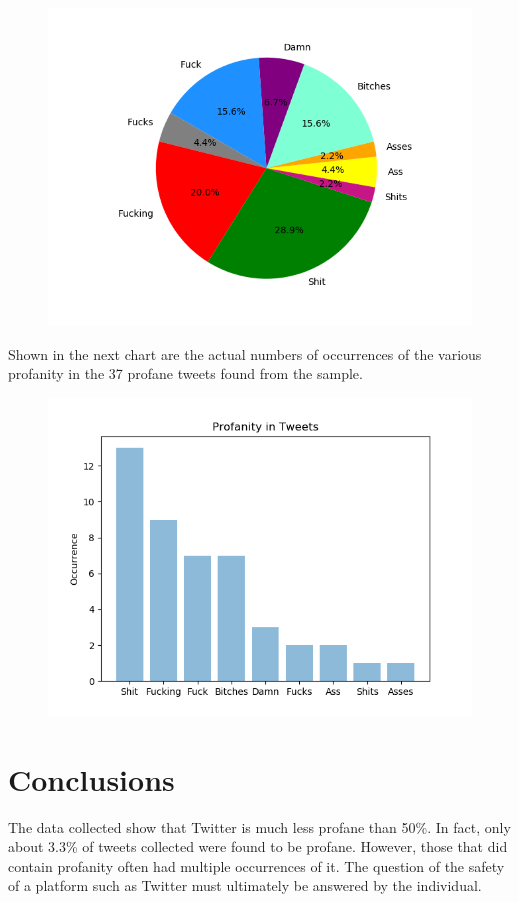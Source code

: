 \documentclass{article}
\begin{document}
\begin{figure}[h]
	\includegraphics[scale=1]{Figure_1}
\end{figure}

Shown in the next chart are the actual numbers of occurrences of the various profanity in the 37 profane tweets found from the sample.

\begin{figure}[h]
	\includegraphics[scale=1]{Figure_2}
\end{figure}

\section{Conclusions}
\tab The data collected show that Twitter is much less profane than 50\%. In fact, only about 3.3\% of tweets collected were found to be profane. However, those that did contain profanity often had multiple occurrences of it. The question of the safety of a platform such as Twitter must ultimately be answered by the individual.
\end{document}
